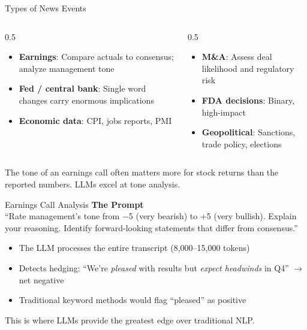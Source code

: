 \documentclass[aspectratio=169]{beamer}
\begin{document}
\begin{frame}{Types of News Events}
\begin{columns}[T]
\begin{column}{0.5\textwidth}
\begin{shadedbox}[title=\textbf{Scheduled Events}]
\begin{itemize}\small
  \item \textbf{Earnings}: Compare actuals to consensus; analyze management tone
  \item \textbf{Fed / central bank}: Single word changes carry enormous implications
  \item \textbf{Economic data}: CPI, jobs reports, PMI
\end{itemize}
\end{shadedbox}
\end{column}
\begin{column}{0.5\textwidth}
\begin{shadedbox}[title=\textbf{Unscheduled Events}]
\begin{itemize}\small
  \item \textbf{M\&A}: Assess deal likelihood and regulatory risk
  \item \textbf{FDA decisions}: Binary, high-impact
  \item \textbf{Geopolitical}: Sanctions, trade policy, elections
\end{itemize}
\end{shadedbox}
\end{column}
\end{columns}
\vspace{0.2cm}
The \alert{tone of an earnings call} often matters more for stock returns than the reported numbers. LLMs excel at tone analysis.
\end{frame}

\begin{frame}{Earnings Call Analysis}
\textbf{The Prompt}\\[0.3em]
\small ``Rate management's tone from $-$5 (very bearish) to +5 (very bullish). Explain your reasoning. Identify forward-looking statements that differ from consensus.''
\normalsize
\vspace{0.3cm}
\begin{itemize}
  \item The LLM processes the entire transcript (8,000--15,000 tokens)
  \item Detects hedging: ``We're \textit{pleased} with results but \textit{expect headwinds} in Q4'' $\rightarrow$ net negative
  \item Traditional keyword methods would flag ``pleased'' as positive
\end{itemize}
\vspace{0.3cm}
\begin{center}
\alert{This is where LLMs provide the greatest edge over traditional NLP.}
\end{center}
\end{frame}
\end{document}
